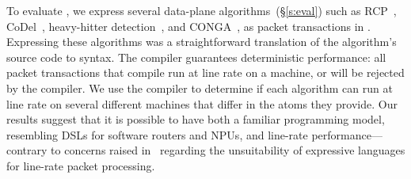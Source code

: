 To evaluate \pktlanguage, we express several data-plane
algorithms~(\S\ref{s:eval}) such as RCP~\cite{rcp}, CoDel~\cite{codel},
heavy-hitter detection~\cite{opensketch}, and CONGA~\cite{conga}, as packet
transactions in \pktlanguage. Expressing these algorithms was a straightforward
translation of the algorithm's source code to \pktlanguage syntax.  The
\pktlanguage compiler guarantees deterministic performance: all packet
transactions that compile run at line rate on a \absmachine machine, or will be
rejected by the compiler.  We use the \pktlanguage compiler to determine if
each algorithm can run at line rate on several different \absmachine machines
that differ in the atoms they provide.  Our results suggest that it is possible
to have both a familiar programming model, resembling DSLs for software routers
and NPUs, and line-rate performance---contrary to concerns raised in~\cite{p4}
regarding the unsuitability of expressive languages for line-rate packet processing.
